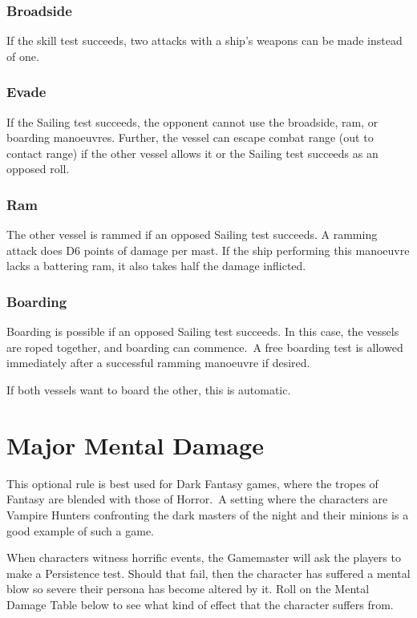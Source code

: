 \subsubsection{Broadside}
If the skill test succeeds, two attacks with a ship’s weapons can be made instead of one.


\subsubsection{Evade}
If the Sailing test succeeds, the opponent cannot use the broadside, ram, or boarding manoeuvres. Further, the vessel can escape combat range (out to contact range) if the other vessel allows it or the Sailing test succeeds as an opposed roll.


\subsubsection{Ram}
The other vessel is rammed if an opposed Sailing test succeeds. A ramming attack does D6 points of damage per mast. If the ship performing this manoeuvre lacks a battering ram, it also takes half the damage inflicted.


\subsubsection{Boarding}
Boarding is possible if an opposed Sailing test succeeds. In this case, the vessels are roped together, and boarding can commence. A free boarding test is allowed immediately after a successful ramming manoeuvre if desired.

If both vessels want to board the other, this is automatic.


\section{Major Mental Damage}
This optional rule is best used for Dark Fantasy games, where the tropes of Fantasy are blended with those of Horror. A setting where the characters are Vampire Hunters confronting the dark masters of the night and their minions is a good example of such a game. 

When characters witness horrific events, the Gamemaster will ask the players to make a Persistence test. Should that fail, then the character has suffered a mental blow so severe their persona has become altered by it. Roll on the Mental Damage Table below to see what kind of effect that the character suffers from. 

